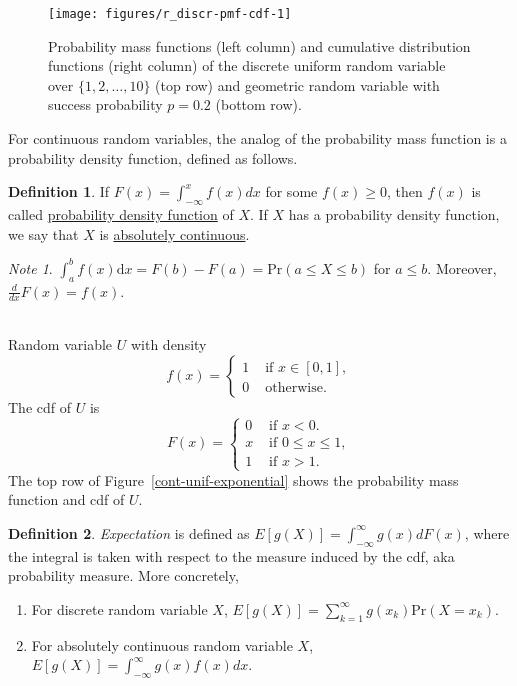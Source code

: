 \documentclass[11pt]{article}\usepackage[]{graphicx}\usepackage[]{color}
\newenvironment{knitrout}{}{} %
\numberwithin{algorithm}{section}
\newcommand{\prob}[1]{\ensuremath{\text{Pr}\left(#1 \right)}}
\theoremstyle{remark}
\newtheorem*{mynote}{Note}
\theoremstyle{definition}
\newtheorem*{define}{Definition}
\newenvironment{example}[1]{\begin{trivlist}
\item[\hskip \labelsep {\bfseries Example}: \underline{#1}]\ \\}{\end{trivlist}}
\begin{document}
\begin{figure}
\centering
\begin{knitrout}
\color{fgcolor}

{\centering \texttt{[image: figures/r\_discr-pmf-cdf-1]} 

}



\end{knitrout}
\caption{Probability mass functions (left column) and cumulative distribution functions (right column) of the discrete uniform 
random variable over $\{1,2,\dots,10\}$ (top row) and geometric random variable with success probability $p = 0.2$ (bottom row).}
\label{discr-unif-geometric}
\end{figure}

For continuous random variables, the analog of the probability mass function is a probability density function,
defined as follows.

\begin{define}
  If $F(x) = \int_{-\infty}^x f(x) dx$ for some $f(x) \ge 0$, then $f(x)$ is called 
  \underline{probability density function} of $X$. If $X$ has a probability density 
  function, we say that $X$ is \underline{absolutely continuous}.
\end{define}

\begin{mynote}
  $\int_a^b f(x) \text{d}x = F(b) - F(a) = \prob{a \le X \le b}$ for $a \le b$. Moreover, 
  $\frac{d}{dx} F(x) = f(x)$. 
\end{mynote}

\begin{example}{Uniform random variable on $[0,1]$}
Random variable $U$ with density 
\[
f(x) = 
\begin{cases}
1 &\text{ if } x \in [0,1],\\
0 &\text{ otherwise}.
\end{cases}
\]
The cdf of $U$ is
\[
F(x) = 
\begin{cases}
0 &\text{ if } x < 0.\\
x &\text{ if } 0 \le x \le 1,\\
1 & \text{ if } x > 1.
\end{cases}
\]
The top row of Figure~\ref{cont-unif-exponential} shows the probability mass function and cdf
of $U$.
\end{example}



\begin{define}
\textit{Expectation} is defined as $E[g(X)] = \int_{-\infty}^{\infty} g(x)dF(x)$, 
where the integral is taken with respect to the measure induced by the cdf, aka probability measure. More concretely,
\begin{enumerate}
\item For discrete random variable $X$, $E[g(X)] = \sum_{k=1}^{\infty} g(x_k) \prob{X=x_k}$.
\item For absolutely continuous random variable $X$, 
$E[g(X)]= \int_{-\infty}^{\infty} g(x) f(x)dx$.
\end{enumerate}
\end{define}
\end{document}

